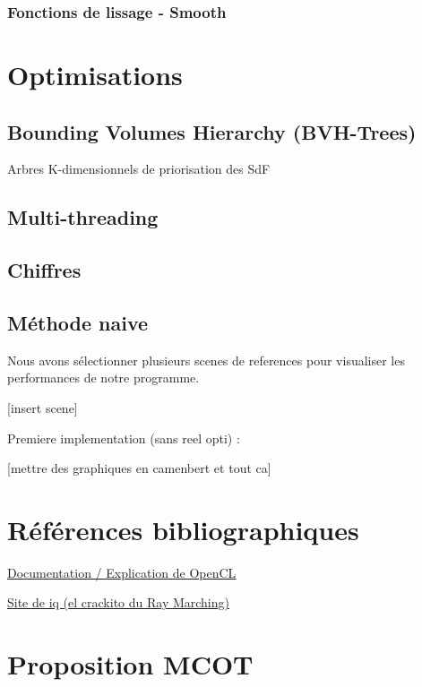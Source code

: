 \documentclass{article}
\begin{document}
\subsubsection{Fonctions de lissage - Smooth}

\section{Optimisations}

\subsection{Bounding Volumes Hierarchy (BVH-Trees)}
Arbres K-dimensionnels de priorisation des SdF

\subsection{Multi-threading}


\subsection{Chiffres}

\subsection{Méthode naive}
Nous avons sélectionner plusieurs scenes de references pour visualiser les performances de notre programme.

[insert scene]

Premiere implementation (sans reel opti) : 

[mettre des graphiques en camenbert et tout ca]

\section{Références bibliographiques}

\underline{\href{https://ieeexplore-ieee-org.gorgone.univ-toulouse.fr/document/5457293}{Documentation / Explication de OpenCL}}
\smallskip 

\underline{\href{https://iquilezles.org/}{Site de iq (el crackito du Ray Marching)}}



\section{Proposition MCOT}
\end{document}
